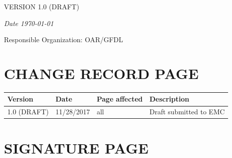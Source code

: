 \documentclass[12pt,letterpaper]{book}
\begin{document}
\begin{titlepage}
	
	\vspace{0.5\baselineskip} %
	
	{\scshape\Large VERSION 1.0 (DRAFT)} %
	
	\vspace{0.5\baselineskip} %
	
	\textit{Date \today} %
	
	\vfill %
	

	
	\vspace{0.3\baselineskip} %
	
	
	{\large Responsible Organization: OAR/GFDL} %

\end{titlepage}



\pagebreak

\section*{CHANGE RECORD PAGE}
\begin{center}
    \begin{tabular}{ | p{1.5cm} | p{1.8cm} | l | p{7cm} |}
    \hline
    \textbf{Version} & \textbf{Date} & \textbf{Page affected} & \textbf{Description }\\ \hline
    1.0 (DRAFT) & 11/28/2017 & all & Draft submitted to EMC \\ \hline
    \hline
    \end{tabular}
\end{center}

\pagebreak
\newpage

\section*{SIGNATURE PAGE}

\vspace{2.5\baselineskip} %
\end{document}
